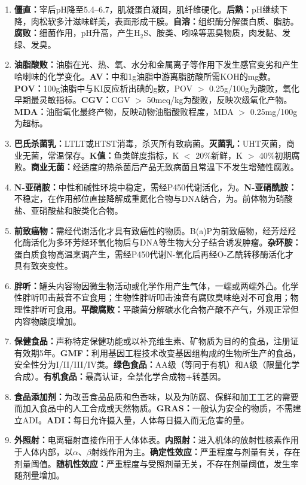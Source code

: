 {\begin{enumerate}[leftmargin=*, itemsep=4pt]
    \item \textbf{僵直：}宰后pH降至5.4--6.7，肌凝蛋白凝固，肌纤维硬化。\textbf{后熟：}pH继续下降，肉松软多汁滋味鲜美，表面形成干膜。\textbf{自溶：}组织酶分解蛋白质、脂肪。\textbf{腐败：}细菌作用，pH升高，产生H$_2$S、胺类、吲哚等恶臭物质，肉发黏、发绿、发臭。
    \item \textbf{油脂酸败：}油脂在光、热、氧、水分和金属离子等作用下发生感官变劣和产生哈喇味的化学变化。\textbf{AV：}中和1g油脂中游离脂肪酸所需KOH的mg数。\textbf{POV：}100g油脂中与KI反应析出碘的g数，POV $>$ 0.25g/100g为酸败，氧化早期最灵敏指标。\textbf{CGV：}CGV $>$ 50meq/kg为酸败，反映次级氧化产物。\textbf{MDA：}油脂氧化最终产物，反映动物油脂酸败程度，MDA $>$ 0.25mg/100g为超标。
    \item \textbf{巴氏杀菌乳：}LTLT或HTST消毒，杀灭所有致病菌。\textbf{灭菌乳：}UHT灭菌，商业无菌，常温保存。\textbf{K值：}鱼类鲜度指标，K $<$ 20\%新鲜，K $>$ 40\%初期腐败。\textbf{商业无菌：}经适度的热杀菌后产品无致病菌且常温下不发生增殖性腐败。
    \item \textbf{N-亚硝胺：}中性和碱性环境中稳定，需经P450代谢活化，为。\textbf{N-亚硝酰胺：}不稳定，在作用部位直接降解成重氮化合物与DNA结合，为。前体物为硝酸盐、亚硝酸盐和胺类化合物。
    \item \textbf{前致癌物：}需经代谢活化才具有致癌性的物质。B(a)P为前致癌物，经芳烃羟化酶活化为多环芳烃环氧化物后与DNA等生物大分子结合诱发肿瘤。\textbf{杂环胺：}蛋白质食物高温烹调产生，需经P450代谢N-氧化后再经O-乙酰转移酶活化才具有致突变性。
    \item \textbf{胖听：}罐头内容物因微生物活动或化学作用产生气体，一端或两端外凸。化学性胖听叩击鼓音不宜食用；生物性胖听叩击浊音有腐败臭味绝对不可食用；物理性胖听可食用。\textbf{平酸腐败：}平酸菌分解碳水化合物产酸不产气，外观正常但内容物酸度增加。
    \item \textbf{保健食品：}声称特定保健功能或以补充维生素、矿物质为目的的食品，注册证有效期5年。\textbf{GMF：}利用基因工程技术改变基因组构成的生物所生产的食品，安全性分为I/II/III/IV类。\textbf{绿色食品：}AA级（等同于有机）和A级（限量化学合成）。\textbf{有机食品：}最高认证，全禁化学合成物+转基因。
    \item \textbf{食品添加剂：}为改善食品品质和色香味，以及为防腐、保鲜和加工工艺的需要而加入食品中的人工合成或天然物质。\textbf{GRAS：}一般认为安全的物质，不需建立ADI。\textbf{ADI：}每日允许摄入量，人体每日摄入而无危害的量。
    \item \textbf{外照射：}电离辐射直接作用于人体体表。\textbf{内照射：}进入机体的放射性核素作用于人体内部，以$\alpha$、$\beta$射线作用为主。\textbf{确定性效应：}严重程度与剂量有关，存在剂量阈值。\textbf{随机性效应：}严重程度与受照剂量无关，不存在剂量阈值，发生率随剂量增加。
\end{enumerate}

}
